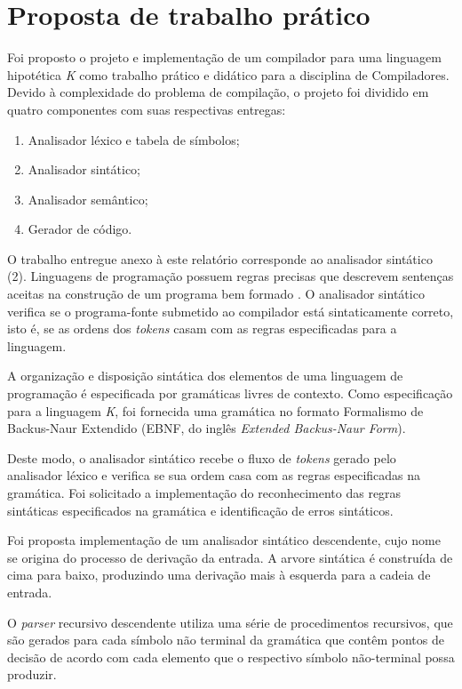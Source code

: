 \section{Proposta de trabalho prático}

Foi proposto o projeto e implementação de um compilador para uma linguagem hipotética \textit{K} como trabalho prático e didático para a disciplina de Compiladores. Devido à complexidade do problema de compilação, o projeto foi dividido em quatro componentes com suas respectivas entregas:

\begin{enumerate}
    \item \label{lexico} Analisador léxico e tabela de símbolos;
    \item Analisador sintático;
    \item Analisador semântico;
    \item Gerador de código.
    
\end{enumerate}

O trabalho entregue anexo à este relatório corresponde ao analisador sintático (2). Linguagens de programação possuem regras precisas que descrevem sentenças aceitas na construção de um programa bem formado \cite{aho2007compilers}. O analisador sintático verifica se o programa-fonte submetido ao compilador está sintaticamente correto, isto é, se as ordens dos \textit{tokens} casam com as regras especificadas para a linguagem.

A organização e disposição sintática dos elementos de uma linguagem de programação é especificada por gramáticas livres de contexto. Como especificação para a linguagem \textit{K}, foi fornecida uma gramática no formato Formalismo de Backus-Naur Extendido (EBNF, do inglês \textit{Extended Backus-Naur Form}).

Deste modo, o analisador sintático recebe o fluxo de \textit{tokens} gerado pelo analisador léxico e verifica se sua ordem casa com as regras especificadas na gramática. Foi solicitado a implementação do reconhecimento das regras sintáticas especificados na gramática e identificação de erros sintáticos.

Foi proposta implementação de um analisador sintático descendente, cujo nome se origina do processo de derivação da entrada. A arvore sintática é construída de cima para baixo, produzindo uma derivação mais à esquerda para a cadeia de entrada.

O \textit{parser} recursivo descendente utiliza uma série de procedimentos recursivos, que são gerados para cada símbolo não terminal da gramática que contêm pontos de decisão de acordo com cada elemento que o respectivo símbolo não-terminal possa produzir.  

